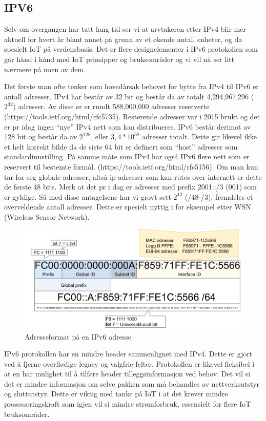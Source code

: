 \documentclass{article}
\begin{document}
\newpage
\subsection{IPV6}
Selv om overgangen har tatt lang tid ser vi at arvtakeren etter IPv4 blir mer aktuell for hvert år blant annet på grunn  av et økende antall enheter, og da spesielt IoT på verdensbasis. Det er flere designelementer i IPv6 protokollen som går hånd i hånd med IoT prinsipper og bruksområder og vi vil nå ser litt nærmere på noen av dem. 

Det første man ofte tenker som hovedårsak behovet for bytte fra IPv4 til IPv6 er antall adresser. IPv4 har består av 32 bit og består da av totalt 4,294,967,296 ($2^{32}$) adresser. Av disse er er rundt 588,000,000 adresser reserverte (https://tools.ietf.org/html/rfc5735). Resterende adresser var i 2015 brukt og det er pr idag ingen “nye” IPv4 nett som kan distribueres. IPv6 består derimot av 128 bit og består da av $2^{128}$, eller $3,4 * 10^{38}$ adresser totalt. Dette gir likevel ikke et helt korrekt bilde da de siste 64 bit er definert  som “host” adresser som standardinnstilling. På samme måte som IPv4 har også IPv6 flere nett som er reservert til bestemte formål. (https://tools.ietf.org/html/rfc5156). Om man kun tar for seg globale adresser, altså ip adresser som kan rutes over internett er dette de første 48 bits. Merk at det pr i dag er adresser med prefix 2001::/3 (001) som er gyldige. Så med disse antagelsene har vi grovt sett $2^{42}$ (/48-/3), fremdeles et overveldende antall adresser. Dette er spesielt nyttig i for eksempel etter WSN (Wireless Sensor Network). 

\begin{figure}[!ht]
  \centering
      \includegraphics[width=1\textwidth]{IPv6adresse}
  \caption {Adresseformat på en IPv6 adresse}
\end{figure}

IPv6 protokollen har en mindre header %
sammenlignet med IPv4. Dette er gjort ved å fjerne overflødige legacy og valgfrie felter. Protokollen er likevel fleksibel i at en har mulighet til å tilføre header tilleggsinformasjon ved behov. Det vil si det er mindre informasjon om selve pakken som må behandles av nettverksutstyr og sluttutstyr. Dette er viktig med tanke på IoT i at det krever mindre prosesseringskraft som igjen vil si mindre strømforbruk, essensielt for flere IoT bruksområder.
\end{document}
